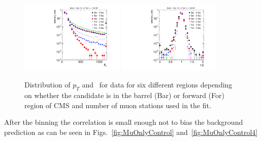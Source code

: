 \begin{figure}
\centering
  \includegraphics[clip=true, trim=0.0cm 0cm 2.8cm 0cm, width=0.44\textwidth]{figures/muonly/Selection_Data8TeV_Pt_Binned_BS}
  \includegraphics[clip=true, trim=0.0cm 0cm 2.8cm 0cm, width=0.44\textwidth]{figures/muonly/Selection_Data8TeV_TOF_Binned_BS}
\caption[Distribution of $p_T$ and \invbeta\ for data in different prediction regions in the \muononly\ analysis]
{Distribution of $p_T$ and \invbeta\ for data for six different regions depending on whether the candidate is in the barrel (Bar)
or forward (For) region of CMS and number of muon stations used in the fit.}
    \label{fig:SelVarBinned}
\end{figure}

After the binning the correlation is small enough not to bias the background prediction as can be seen in Figs.~\ref{fig:MuOnlyControl} and~\ref{fig:MuOnlyControl4}

